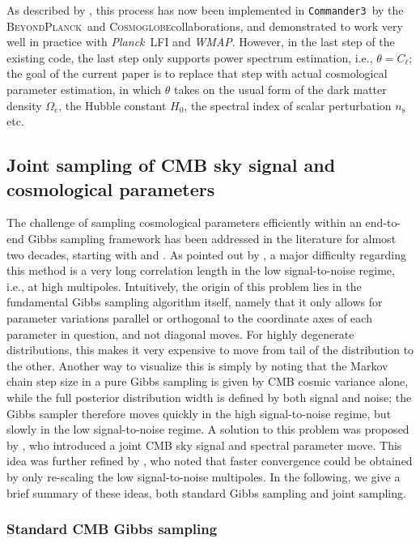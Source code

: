 \documentclass[twocolumn]{../common/aa}
\def\WMAP{\emph{WMAP}}
\def\Planck{\emph{Planck}}
\def\commanderthree{\texttt{Commander3}}
\newcommand{\BP}{\textsc{BeyondPlanck}}
\newcommand{\Cosmoglobe}{\textsc{Cosmoglobe}}
\begin{document}
As described by \citet{bp01,watts2023_dr1}, this process has now been implemented in \commanderthree\ by the \BP\ and \Cosmoglobe collaborations, and demonstrated to work very well in practice with \Planck\ LFI and \WMAP. However, in the last step of the existing code, the last step only supports power spectrum estimation, i.e., $\theta = C_{\ell}$; the goal of the current paper is to replace that step with actual cosmological parameter estimation, in which $\theta$ takes on the usual form of the dark matter density $\Omega_\mathrm{c}$, the Hubble constant $H_0$, the spectral index of scalar perturbation $n_\mathrm{s}$ etc.

\subsection{Joint sampling of CMB sky signal and cosmological parameters}

The challenge of sampling cosmological parameters efficiently within an end-to-end Gibbs sampling framework has been addressed in the literature for almost two decades, starting with \citet{jewell2004} and \citet{wandelt2004}. As pointed out by \citet{eriksen:2004}, a major difficulty regarding this method is a very long correlation length in the low signal-to-noise regime, i.e., at high multipoles. Intuitively, the origin of this problem lies in the fundamental Gibbs sampling algorithm itself, namely that it only allows for parameter variations parallel or orthogonal to the coordinate axes of each parameter in question, and not diagonal moves. For highly degenerate distributions, this makes it very expensive to move from tail of the distribution to the other. Another way to visualize this is simply by noting that the Markov chain step size in a pure Gibbs sampling is given by CMB cosmic variance alone, while the full posterior distribution width is defined by both signal and noise; the Gibbs sampler therefore moves quickly in the high signal-to-noise regime, but slowly in the low signal-to-noise regime. A solution to this problem was proposed by \citet{jewell:2009}, who introduced a joint CMB sky signal and spectral parameter move. This idea was further refined by \citet{racine:2016}, who noted that faster convergence could be obtained by only re-scaling the low signal-to-noise multipoles. In the following, we give a brief summary of these ideas, both standard Gibbs sampling and joint sampling.

\subsubsection{Standard CMB Gibbs sampling}
\label{sec:gibbs}
\end{document}
